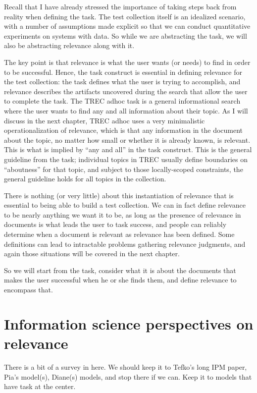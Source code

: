 \documentclass[nobib]{tufte-book}
\begin{document}
Recall that I have already stressed the importance of taking steps back from reality when defining the task.  The test collection itself is an idealized scenario, with a number of assumptions made explicit so that we can conduct quantitative experiments on systems with data.  So while we are abstracting the task, we will also be abstracting relevance along with it.

The key point is that relevance is what the user wants (or needs) to find in order to be successful.  Hence, the task construct is essential in defining relevance for the test collection: the task defines what the user is trying to accomplish, and relevance describes the artifacts uncovered during the search that allow the user to complete the task.  The TREC adhoc task is a general informational search where the user wants to find any and all information about their topic.  As I will discuss in the next chapter, TREC adhoc uses a very minimalistic operationalization of relevance, which is that any information in the document about the topic, no matter how small or whether it is already known, is relevant.  This is what is implied by ``any and all'' in the task construct.  This is the general guideline from the task; individual topics in TREC usually define boundaries on ``aboutness'' for that topic, and subject to those locally-scoped constraints, the general guideline holds for all topics in the collection.

There is nothing (or very little) about this instantiation of relevance that is essential to being able to build a test collection.  We can in fact define relevance to be nearly anything we want it to be, as long as the presence of relevance in documents is what leads the user to task success, and people can reliably determine when a document is relevant as relevance has been defined.  Some definitions can lead to intractable problems gathering relevance judgments, and again those situations will be covered in the next chapter.

So we will start from the task, consider what it is about the documents that makes the user successful when he or she finds them, and define relevance to encompass that.

\section{Information science perspectives on relevance}

There is a bit of a survey in here.  We should keep it to Tefko's long IPM paper, Pia's model(s), Diane(s) models, and stop there if we can.  Keep it to models that have task at the center.
\end{document}
